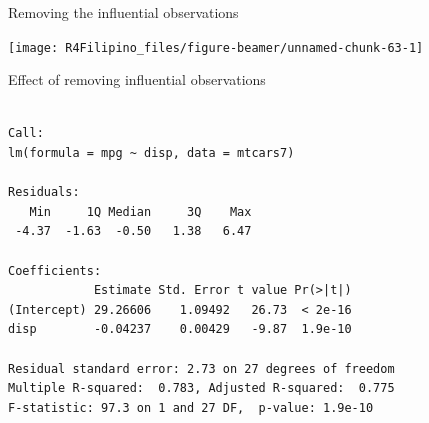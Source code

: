 \begin{frame}[fragile]{Removing the influential observations}

\begin{Shaded}
\end{Shaded}

\begin{center}\texttt{[image: R4Filipino\_files/figure-beamer/unnamed-chunk-63-1]} \end{center}

\end{frame}

\begin{frame}[fragile]{Effect of removing influential observations}

\begin{Shaded}
\begin{Highlighting}[]
\end{Highlighting}
\end{Shaded}

\begin{verbatim}

Call:
lm(formula = mpg ~ disp, data = mtcars7)

Residuals:
   Min     1Q Median     3Q    Max 
 -4.37  -1.63  -0.50   1.38   6.47 

Coefficients:
            Estimate Std. Error t value Pr(>|t|)
(Intercept) 29.26606    1.09492   26.73  < 2e-16
disp        -0.04237    0.00429   -9.87  1.9e-10

Residual standard error: 2.73 on 27 degrees of freedom
Multiple R-squared:  0.783, Adjusted R-squared:  0.775 
F-statistic: 97.3 on 1 and 27 DF,  p-value: 1.9e-10
\end{verbatim}

\end{frame}

